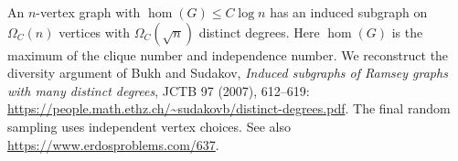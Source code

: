 An \(n\)-vertex graph with
\(\operatorname{hom}(G)\leq C\log n\) has an induced subgraph on
\(\Omega_C(n)\) vertices with \(\Omega_C(\sqrt n)\) distinct degrees.
Here \(\operatorname{hom}(G)\) is the maximum of the clique number
and independence number.
We reconstruct the diversity argument of Bukh and Sudakov,
\emph{Induced subgraphs of Ramsey graphs with many distinct degrees},
JCTB 97 (2007), 612--619:
\url{https://people.math.ethz.ch/~sudakovb/distinct-degrees.pdf}.
The final random sampling uses independent vertex choices.
See also \url{https://www.erdosproblems.com/637}.

